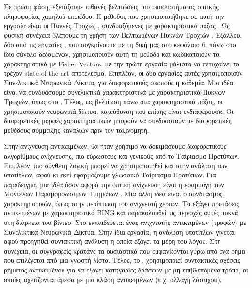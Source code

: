 \documentclass[11pt,a4paper,english,greek,twoside]{../Thesis}
\begin{document}
\par Σε πρώτη φάση, εξετάζουμε πιθανές βελτιώσεις του υποσυστήματος οπτικής πληροφορίας χαμηλού επιπέδου. Η μέθοδος που χρησιμοποιήθηκε σε αυτή την εργασία είναι οι Πυκνές Τροχιές \cite{wang_2011}, συνδυαζόμενες με χαρακτηριστικά πόζας \cite{rohrbach_2012}. Ως φυσική συνέχεια βλέπουμε τη χρήση των Βελτιωμένων Πυκνών Τροχιών \cite{wang_2013}. Εξάλλου, δύο από τις εργασίες \cite{cherian_2017}, \cite{cheron_2015} που συγκρίνουμε με τη δική μας στο κεφάλαιο 6, πάνω στο ίδιο σύνολο δεδομένων, χρησιμοποιούν αυτή τη μέθοδο και κωδικοποιούν τα χαρακτηριστικά με Fisher Vectors, με την πρώτη εργασία μάλιστα να πετυχαίνει το τρέχον state-of-the-art αποτέλεσμα. Επιπλέον, οι δύο εργασίες αυτές χρησιμοποιούν Συνελικτικά Νευρωνικά Δίκτυα, για διαφορετικούς σκοπούς η κάθεμία. Μια ιδέα είναι να συνδυάσουμε συνελικτικά χαρακτηριστικά με χαρακτηριστικά Πυκνών Τροχιών, όπως στο \cite{cherian_2017}. Τέλος, ως βελτίωση πάνω στα χαρακτηριστικά πόζας, οι \cite{cheron_2015} χρησιμοποιούν νευρωνικά δίκτυα, κατεύθυνση που επίσης είναι ενδιαφέρουσα. Οι διαφορετικές μορφές χαρακτηριστικών μπορούν να συνδυαστούν με διαφορετικές μεθόδους σύμμειξης καναλιών πριν τον ταξινομητή.

\par Στην ανίχνευση αντικειμένων, θα ήταν χρήσιμο να δοκιμάσουμε διαφορετικούς αλγορίθμους ανίχνευσης, πιο εύρωστους και γενικούς από το Ταίριασμα Προτύπων. Επιπλέον, πιο σύνθετη λογική μπορεί να χρησιμοποιηθεί και στην ανάλυση των υποτίτλων, αφού κι εκεί εφαρμόζουμε γλωσσικό Ταίριασμα Προτύπων. Για παράδειγμα, μια ιδέα όσον αφορά την οπτική ανίχνευση είναι η εφαρμογή των Μοντέλων Παραμορφώσιμων Τμημάτων \cite{felzenszwalb_2008}. Μια άλλη ιδέα είναι ο συνδυασμός χαρακτηριστικών, όπως στην περίπτωση του ανιχνευτή χεριών. Το \cite{zhou_2015} εξάγει προτάσεις αντικειμένων με χαρακτηριστικά BING και παρακολουθεί τις περιοχές αυτές πυκνά στη διάρκεια του βίντεο. Στο \cite{malmaud_2015} εκπαιδεύεται ένας ανιχνευτής αντικειμένων (τροφών) με Συνελικτικά Νευρωνικά Δίκτυα. Στην ίδια εργασία, η ανάλυση υποτίτλων γίνεται αφού προηγηθεί συντακτική ανάλυση η οποία εξάγει τα μέρη του λόγου. Στη συνέχεια, οι συγγραφείς κρατάνε τα ουσιαστικά που εμφανίζονται γύρω από ένα ρήμα που επιλέγεται από μια γνωστή λίστα. Τέλος, το \cite{alayrac_2016}, χρησιμοποιεί συντακτικές σχέσεις ρήματος-αντικειμένου για να εξάγει κατηγορίες δράσεων με μη επιβλεπόμενο τρόπο, οι οποίες σχετίζονται άμεσα με μια κλάση αντικειμένων (π.χ. αλλαγή λάστιχου).
\end{document}
